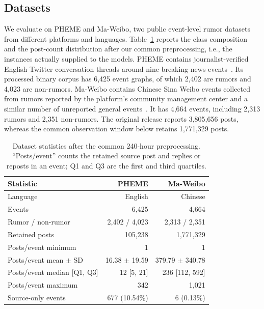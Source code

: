 \documentclass[sigconf,anonymous,review]{../acmart/acmart}
\begin{document}
\subsection{Datasets}
\label{sec:data}

We evaluate on PHEME and Ma-Weibo, two public event-level rumor datasets from
different platforms and languages.  Table~\ref{tab:datasets} reports the
class composition and the post-count distribution after our common
preprocessing, i.e., the instances actually supplied to the models.  PHEME
contains journalist-verified English Twitter conversation threads around nine
breaking-news events~\cite{zubiaga2016pheme}.  Its processed binary corpus has
6,425 event graphs, of which 2,402 are rumors and 4,023 are non-rumors.
Ma-Weibo contains Chinese Sina Weibo events collected from rumors reported by
the platform's community management center and a similar number of unreported
general events~\cite{ma2016rnn}.  It has 4,664 events, including 2,313 rumors
and 2,351 non-rumors.  The original release reports 3,805,656 posts, whereas
the common observation window below retains 1,771,329 posts.

\begin{table}[t]
  \caption{Dataset statistics after the common 240-hour preprocessing.
  ``Posts/event'' counts the retained source post and replies or reposts in an
  event; Q1 and Q3 are the first and third quartiles.}
  \label{tab:datasets}
  \centering
  \small
  \setlength{\tabcolsep}{6pt}
  \begin{tabular}{@{}lrr@{}}
    \toprule
    Statistic & PHEME & Ma-Weibo \\
    \midrule
    Language & English & Chinese \\
    Events & 6,425 & 4,664 \\
    Rumor / non-rumor & 2,402 / 4,023 & 2,313 / 2,351 \\
    Retained posts & 105,238 & 1,771,329 \\
    Posts/event minimum & 1 & 1 \\
    Posts/event mean $\pm$ SD & 16.38 $\pm$ 19.59 &
    379.79 $\pm$ 340.78 \\
    Posts/event median [Q1, Q3] & 12 [5, 21] & 236 [112, 592] \\
    Posts/event maximum & 342 & 1,021 \\
    Source-only events & 677 (10.54\%) & 6 (0.13\%) \\
    \bottomrule
  \end{tabular}
\end{table}
\end{document}
